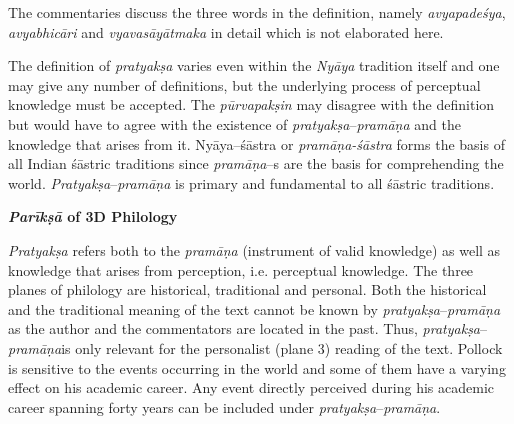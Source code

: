 The commentaries discuss the three words in the definition, namely \textit{avyapadeśya}, \textit{avyabhicāri} and \textit{vyavasāyātmaka} in detail which is not elaborated here.

The definition of \textit{pratyakṣa} varies even within the \textit{Nyāya} tradition itself and one may give any number of definitions, but the underlying process of perceptual knowledge must be accepted. The \textit{pūrvapakṣin} may disagree with the definition but would have to agree with the existence of \textit{pratyakṣa}–\textit{pramāṇa} and the knowledge that arises from it. Nyāya–śāstra or \textit{pramāṇa-śāstra} forms the basis of all Indian śāstric traditions since\textit{ pramāṇa}–s are the basis for comprehending the world. \textit{Pratyakṣa}–\textit{pramāṇa }is primary and fundamental to all śāstric traditions.


\textbf{\textit{Parīkṣā} of 3D Philology}

\textit{Pratyakṣa} refers both to the \textit{pramāṇa} (instrument of valid knowledge) as well as knowledge that arises from perception, i.e. perceptual knowledge. The three planes of philology are historical, traditional and personal. Both the historical and the traditional meaning of the text cannot be known by \textit{pratyakṣa}–\textit{pramāṇa} as the author and the commentators are located in the past. Thus, \textit{pratyakṣa}–\textit{pramāṇa}is only relevant for the personalist (plane 3) reading of the text. Pollock is sensitive to the events occurring in the world and some of them have a varying effect on his academic career. Any event directly perceived during his academic career spanning forty years can be included under \textit{pratyakṣa}–\textit{pramāṇa}.

\vspace{-.3cm}

